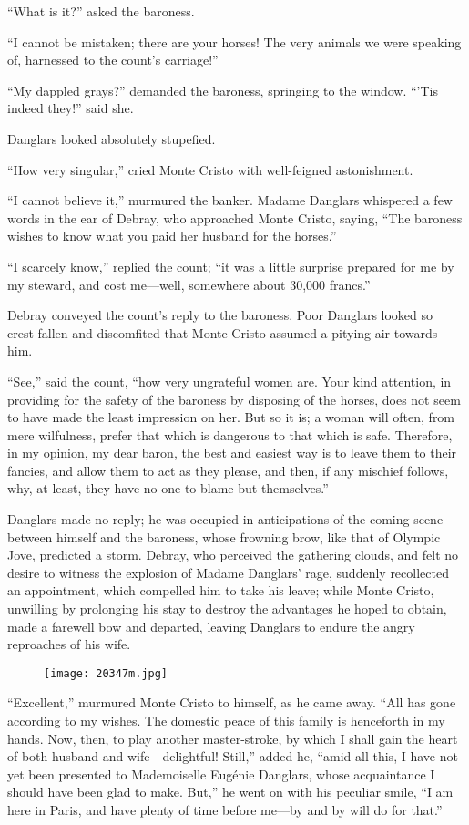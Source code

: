 “What is it?” asked the baroness.

“I cannot be mistaken; there are your horses! The very animals we were
speaking of, harnessed to the count’s carriage!”

“My dappled grays?” demanded the baroness, springing to the window.
“’Tis indeed they!” said she.

Danglars looked absolutely stupefied.

“How very singular,” cried Monte Cristo with well-feigned astonishment.

“I cannot believe it,” murmured the banker. Madame Danglars whispered a
few words in the ear of Debray, who approached Monte Cristo, saying,
“The baroness wishes to know what you paid her husband for the horses.”

“I scarcely know,” replied the count; “it was a little surprise
prepared for me by my steward, and cost me—well, somewhere about 30,000
francs.”

Debray conveyed the count’s reply to the baroness. Poor Danglars looked
so crest-fallen and discomfited that Monte Cristo assumed a pitying air
towards him.

“See,” said the count, “how very ungrateful women are. Your kind
attention, in providing for the safety of the baroness by disposing of
the horses, does not seem to have made the least impression on her. But
so it is; a woman will often, from mere wilfulness, prefer that which
is dangerous to that which is safe. Therefore, in my opinion, my dear
baron, the best and easiest way is to leave them to their fancies, and
allow them to act as they please, and then, if any mischief follows,
why, at least, they have no one to blame but themselves.”

Danglars made no reply; he was occupied in anticipations of the coming
scene between himself and the baroness, whose frowning brow, like that
of Olympic Jove, predicted a storm. Debray, who perceived the gathering
clouds, and felt no desire to witness the explosion of Madame Danglars’
rage, suddenly recollected an appointment, which compelled him to take
his leave; while Monte Cristo, unwilling by prolonging his stay to
destroy the advantages he hoped to obtain, made a farewell bow and
departed, leaving Danglars to endure the angry reproaches of his wife.

\begin{figure}[ht]
\texttt{[image: 20347m.jpg]}
\end{figure}

“Excellent,” murmured Monte Cristo to himself, as he came away. “All
has gone according to my wishes. The domestic peace of this family is
henceforth in my hands. Now, then, to play another master-stroke, by
which I shall gain the heart of both husband and wife—delightful!
Still,” added he, “amid all this, I have not yet been presented to
Mademoiselle Eugénie Danglars, whose acquaintance I should have been
glad to make. But,” he went on with his peculiar smile, “I am here in
Paris, and have plenty of time before me—by and by will do for that.”

